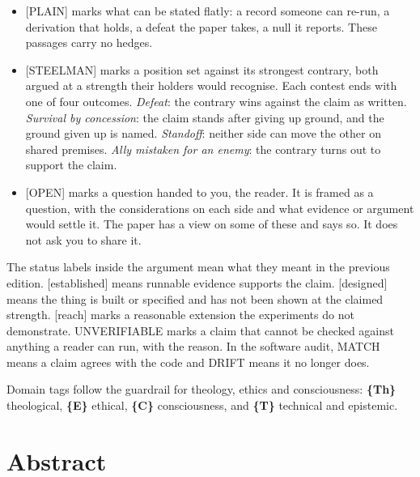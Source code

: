 \documentclass[11pt]{article}
\newcommand{\register}[1]{{\ttfamily\small #1}}
\begin{document}
\begin{itemize}
\item \register{[PLAIN]} marks what can be stated flatly: a record someone can re-run, a derivation that holds, a defeat the paper takes, a null it reports. These passages carry no hedges.
\item \register{[STEELMAN]} marks a position set against its strongest contrary, both argued at a strength their holders would recognise. Each contest ends with one of four outcomes. \emph{Defeat}: the contrary wins against the claim as written. \emph{Survival by concession}: the claim stands after giving up ground, and the ground given up is named. \emph{Standoff}: neither side can move the other on shared premises. \emph{Ally mistaken for an enemy}: the contrary turns out to support the claim.
\item \register{[OPEN]} marks a question handed to you, the reader. It is framed as a question, with the considerations on each side and what evidence or argument would settle it. The paper has a view on some of these and says so. It does not ask you to share it.
\end{itemize}
The status labels inside the argument mean what they meant in the previous edition. [established] means runnable evidence supports the claim. [designed] means the thing is built or specified and has not been shown at the claimed strength. [reach] marks a reasonable extension the experiments do not demonstrate. UNVERIFIABLE marks a claim that cannot be checked against anything a reader can run, with the reason. In the software audit, MATCH means a claim agrees with the code and DRIFT means it no longer does.

Domain tags follow the guardrail for theology, ethics and consciousness: \textbf{\{Th\}} theological, \textbf{\{E\}} ethical, \textbf{\{C\}} consciousness, and \textbf{\{T\}} technical and epistemic.

\section*{Abstract}
\end{document}
